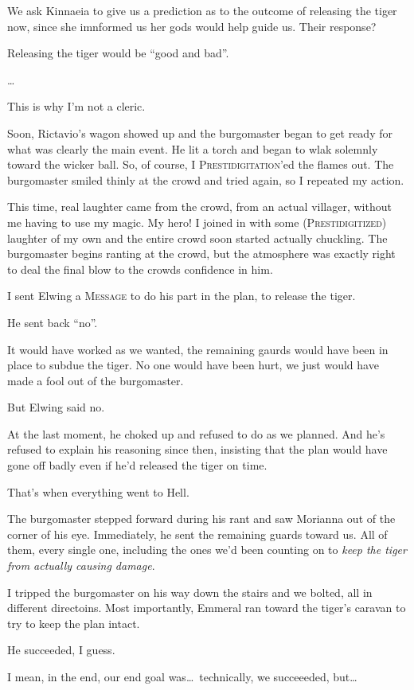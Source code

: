 We ask Kinnaeia to give us a prediction as to the outcome of releasing the tiger now, since she imnformed us her gods would help guide us. Their response?

Releasing the tiger would be ``good and bad''.

\dots

This is why I'm not a cleric.

Soon, Rictavio's wagon showed up and the burgomaster began to get ready for what was clearly the main event. He lit a torch and began to wlak solemnly toward the wicker ball. So, of course, I \textsc{Prestidigitation}'ed the flames out. The burgomaster smiled thinly at the crowd and tried again, so I repeated my action.

This time, real laughter came from the crowd, from an actual villager, without me having to use my magic. My hero! I joined in with some (\textsc{Prestidigitized}) laughter of my own and the entire crowd soon started actually chuckling. The burgomaster begins ranting at the crowd, but the atmosphere was exactly right to deal the final blow to the crowds confidence in him.

I sent Elwing a \textsc{Message} to do his part in the plan, to release the tiger.

He sent back ``no''.

It would have worked as we wanted, the remaining gaurds would have been in place to subdue the tiger. No one would have been hurt, we just would have made a fool out of the burgomaster.

But Elwing said no.

At the last moment, he choked up and refused to do as we planned. And he's refused to explain his reasoning since then, insisting that the plan would have gone off badly even if he'd released the tiger on time.

That's when everything went to Hell.

The burgomaster stepped forward during his rant and saw Morianna out of the corner of his eye. Immediately, he sent the remaining guards toward us. All of them, every single one, including the ones we'd been counting on to \emph{keep the tiger from actually causing damage}.

I tripped the burgomaster on his way down the stairs and we bolted, all in different directoins. Most importantly, Emmeral ran toward the tiger's caravan to try to keep the plan intact.

He succeeded, I guess.

I mean, in the end, our end goal was\dots\ technically, we succeeeded, but\dots


